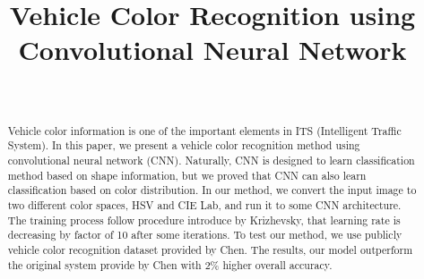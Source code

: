 \documentclass[conference]{IEEEtran}
\begin{document}
%
\title{Vehicle Color Recognition using Convolutional Neural Network}


% 
\author{%
\\} %



\maketitle


\begin{abstract}
Vehicle color information is one of the important elements in ITS (Intelligent Traffic System). In this paper, we present a vehicle color recognition method using convolutional neural network (CNN). Naturally, CNN is designed to learn classification method based on shape information, but we proved that CNN can also learn classification based on color distribution. In our method, we convert the input image to two different color spaces, HSV and CIE Lab, and run it to some CNN architecture. The training process follow procedure introduce by Krizhevsky, that learning rate is decreasing by factor of 10 after some iterations. To test our method, we use publicly vehicle color recognition dataset provided by Chen. The results, our model outperform the original system provide by Chen with 2\% higher overall accuracy.
\end{abstract}
\end{document}
